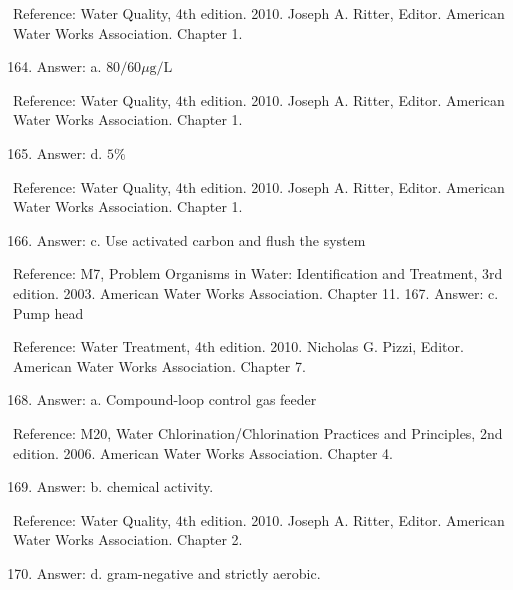 \documentclass[10pt]{article}
\begin{document}
Reference: Water Quality, 4th edition. 2010. Joseph A. Ritter, Editor. American Water Works Association. Chapter 1.

\begin{enumerate}
  \setcounter{enumi}{163}
  \item Answer: a. $80 / 60 \mu \mathrm{g} / \mathrm{L}$
\end{enumerate}

Reference: Water Quality, 4th edition. 2010. Joseph A. Ritter, Editor. American Water Works Association. Chapter 1.

\begin{enumerate}
  \setcounter{enumi}{164}
  \item Answer: d. $5 \%$
\end{enumerate}

Reference: Water Quality, 4th edition. 2010. Joseph A. Ritter, Editor. American Water Works Association. Chapter 1.

\begin{enumerate}
  \setcounter{enumi}{165}
  \item Answer: c. Use activated carbon and flush the system
\end{enumerate}

Reference: M7, Problem Organisms in Water: Identification and Treatment, 3rd edition. 2003. American Water Works Association. Chapter 11. 167. Answer: c. Pump head

Reference: Water Treatment, 4th edition. 2010. Nicholas G. Pizzi, Editor. American Water Works Association. Chapter 7.

\begin{enumerate}
  \setcounter{enumi}{167}
  \item Answer: a. Compound-loop control gas feeder
\end{enumerate}

Reference: M20, Water Chlorination/Chlorination Practices and Principles, 2nd edition. 2006. American Water Works Association. Chapter 4.

\begin{enumerate}
  \setcounter{enumi}{168}
  \item Answer: b. chemical activity.
\end{enumerate}

Reference: Water Quality, 4th edition. 2010. Joseph A. Ritter, Editor. American Water Works Association. Chapter 2.

\begin{enumerate}
  \setcounter{enumi}{169}
  \item Answer: d. gram-negative and strictly aerobic.
\end{enumerate}
\end{document}
